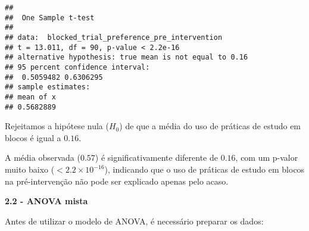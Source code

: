 \documentclass[
]{article}
\newenvironment{Shaded}{\begin{snugshade}}{\end{snugshade}}
\newcommand{\AttributeTok}[1]{\textcolor[rgb]{0.13,0.29,0.53}{#1}}
\newcommand{\CommentTok}[1]{\textcolor[rgb]{0.56,0.35,0.01}{\textit{#1}}}
\newcommand{\DecValTok}[1]{\textcolor[rgb]{0.00,0.00,0.81}{#1}}
\newcommand{\FunctionTok}[1]{\textcolor[rgb]{0.13,0.29,0.53}{\textbf{#1}}}
\newcommand{\NormalTok}[1]{#1}
\newcommand{\OtherTok}[1]{\textcolor[rgb]{0.56,0.35,0.01}{#1}}
\newcommand{\SpecialCharTok}[1]{\textcolor[rgb]{0.81,0.36,0.00}{\textbf{#1}}}
\newcommand{\StringTok}[1]{\textcolor[rgb]{0.31,0.60,0.02}{#1}}
\begin{document}
\begin{verbatim}
## 
##  One Sample t-test
## 
## data:  blocked_trial_preference_pre_intervention
## t = 13.011, df = 90, p-value < 2.2e-16
## alternative hypothesis: true mean is not equal to 0.16
## 95 percent confidence interval:
##  0.5059482 0.6306295
## sample estimates:
## mean of x 
## 0.5682889
\end{verbatim}

Rejeitamos a hipótese nula (\(H_0\)) de que a média do uso de práticas
de estudo em blocos é igual a \(0.16\).

A média observada (\(0.57\)) é significativamente diferente de \(0.16\),
com um p-valor muito baixo (\(< 2.2 \times 10^{-16}\)), indicando que o
uso de práticas de estudo em blocos na pré-intervenção não pode ser
explicado apenas pelo acaso.

\textbf{2.2 - ANOVA mista}

Antes de utilizar o modelo de ANOVA, é necessário preparar os dados:

\begin{Shaded}
\end{Shaded}
\end{document}
